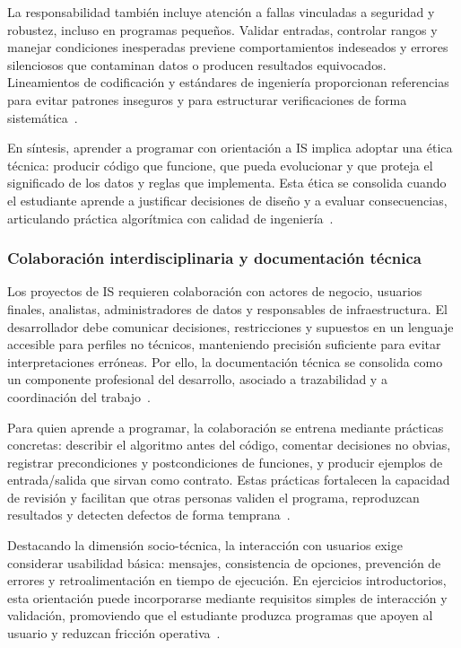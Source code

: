\documentclass[12pt,twoside]{book}
\begin{document}
						La responsabilidad también incluye atención a fallas vinculadas a seguridad y robustez, incluso en programas pequeños. Validar entradas, controlar rangos y manejar condiciones inesperadas previene comportamientos indeseados y errores silenciosos que contaminan datos o producen resultados equivocados. Lineamientos de codificación y estándares de ingeniería proporcionan referencias para evitar patrones inseguros y para estructurar verificaciones de forma sistemática~\cite{ISO247722024Programming,Ghezzi2003Fundamentals,Pressman2019Software}.
						
						En síntesis, aprender a programar con orientación a IS implica adoptar una ética técnica: producir código que funcione, que pueda evolucionar y que proteja el significado de los datos y reglas que implementa. Esta ética se consolida cuando el estudiante aprende a justificar decisiones de diseño y a evaluar consecuencias, articulando práctica algorítmica con calidad de ingeniería~\cite{Sommerville2015Software,Ghezzi2003Fundamentals,Wirth1976Algorithms}.
						
					\subsubsection{Colaboración interdisciplinaria y documentación técnica}
						\noindent
						Los proyectos de IS requieren colaboración con actores de negocio, usuarios finales, analistas, administradores de datos y responsables de infraestructura. El desarrollador debe comunicar decisiones, restricciones y supuestos en un lenguaje accesible para perfiles no técnicos, manteniendo precisión suficiente para evitar interpretaciones erróneas. Por ello, la documentación técnica se consolida como un componente profesional del desarrollo, asociado a trazabilidad y a coordinación del trabajo~\cite{Kendall2014Systems,Tegarden2025Systems,Laudon2020Management}.
						
						Para quien aprende a programar, la colaboración se entrena mediante prácticas concretas: describir el algoritmo antes del código, comentar decisiones no obvias, registrar precondiciones y postcondiciones de funciones, y producir ejemplos de entrada/salida que sirvan como contrato. Estas prácticas fortalecen la capacidad de revisión y facilitan que otras personas validen el programa, reproduzcan resultados y detecten defectos de forma temprana~\cite{Hanly2015Problem,Gaddis2022Starting,Pressman2019Software}.
						
						Destacando la dimensión socio-técnica, la interacción con usuarios exige considerar usabilidad básica: mensajes, consistencia de opciones, prevención de errores y retroalimentación en tiempo de ejecución. En ejercicios introductorios, esta orientación puede incorporarse mediante requisitos simples de interacción y validación, promoviendo que el estudiante produzca programas que apoyen al usuario y reduzcan fricción operativa~\cite{Dix2004HCI,Laudon2020Management,Kendall2014Systems}.
						
\end{document}
